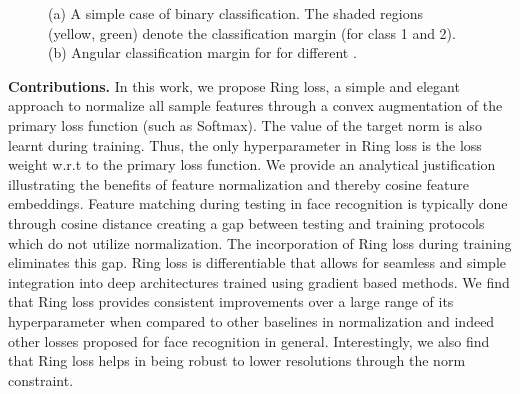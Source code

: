 \documentclass[10pt,twocolumn,letterpaper]{article}
\begin{document}
\begin{figure*}



    \begin{center}
    \end{center}
    \vspace{-0.7cm}
\caption{  (a) A simple case of binary classification.  The shaded regions (yellow, green)  denote the classification margin (for class 1 and 2).  (b)  Angular classification margin for  for different . }
\label{fig_class_margin_visualization}
\vspace{-0.5cm}
\end{figure*}




\textbf{Contributions.} In this work, we propose Ring loss, a simple and elegant approach to normalize all sample features through a convex augmentation of the primary loss function (such as Softmax). The value of the target norm is also learnt during training. Thus, the only hyperparameter in Ring  loss is the loss weight w.r.t to the primary loss function. We provide an analytical justification illustrating the benefits of feature normalization and thereby cosine feature embeddings. Feature matching during testing in face recognition is typically done through cosine distance creating a gap between testing and training protocols which do not utilize normalization. The incorporation of Ring loss during training eliminates this gap. Ring loss is differentiable that allows for seamless and simple integration into deep architectures trained using gradient based methods. We find that Ring loss provides consistent improvements over a large range of its hyperparameter when compared to other baselines in normalization and indeed other losses proposed for face recognition in general. Interestingly, we also find that Ring loss helps in being robust to lower resolutions through the norm constraint.
\end{document}
